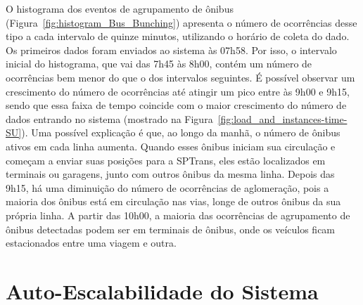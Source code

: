 


O histograma dos eventos de agrupamento de ônibus (Figura~\ref{fig:histogram_Bus_Bunching}) apresenta o número de ocorrências desse tipo a cada intervalo de quinze minutos, utilizando o horário de coleta do dado. Os primeiros dados foram enviados ao sistema às 07h58. Por isso, o  intervalo inicial do histograma, que vai das 7h45 às 8h00, contém um número de ocorrências bem menor do que o dos intervalos seguintes.
É possível observar um crescimento do número de ocorrências até atingir um pico entre às 9h00 e 9h15, sendo que essa faixa de tempo coincide com o maior crescimento do número de dados entrando no sistema (mostrado na Figura~\ref{fig:load_and_instances-time-SU}). Uma possível explicação é que, ao longo da manhã, o número de ônibus ativos em cada linha aumenta. Quando esses ônibus iniciam sua circulação e começam a enviar suas posições para a SPTrans, eles estão localizados em terminais ou garagens, junto com outros ônibus da mesma linha. Depois das 9h15, há uma diminuição do número de ocorrências de aglomeração, pois a maioria dos ônibus está em circulação nas vias, longe de outros ônibus da sua própria linha. A partir das 10h00, a maioria das ocorrências de agrupamento de ônibus detectadas podem ser em terminais de ônibus, onde os veículos ficam estacionados entre uma viagem e outra. 

\section{Auto-Escalabilidade do Sistema}
\label{sec:auto_scalability}



